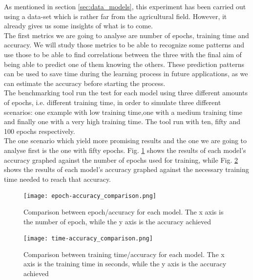 As mentioned in section \ref{sec:data_models}, this experiment has been carried out using a data-set which is rather far from the agricultural field. However, it already gives us some insights of what is to come. \\
The first metrics we are going to analyse are number of epochs, training time and accuracy. We will study those metrics to be able to recognize some patterns and use those to be able to find correlations between the three with the final aim of being able to predict one of them knowing the others. These prediction patterns can be used to save time during the learning process in future applications, as we can estimate the accuracy before starting the process.  \\
The benchmarking tool run the test for each model using three different amounts of epochs, i.e. different training time, in order to simulate three different scenarios: one example with low training time,one with a medium training time and finally one with a very high training time. The tool run with ten, fifty and 100 epochs respectively. \\
The one scenario which yield more promising results and the one we are going to analyse first is the one with fifty epochs. Fig. \ref{fig:com_ep_ac_models} shows the results of each model's accuracy graphed against the number of epochs used for training, while  Fig. \ref{fig:com_ti_ac_models} shows the results of each model's accuracy graphed against the necessary training time needed to reach that accuracy.\\




\begin{figure}[h]
       \centering 
	    \texttt{[image: epoch-accuracy\_comparison.png]}
        \caption[Comparison between epoch/accuracy for each model]{Comparison between epoch/accuracy for each model. The x axis is the number of epoch, while the y axis is the accuracy achieved}
         \label{fig:com_ep_ac_models}
     \end{figure}
\begin{figure}[h]
\centering 
	    \texttt{[image: time-accuracy\_comparison.png]}
        \caption[Comparison between training time/accuracy for each model]{Comparison between training time/accuracy for each model. The x axis is the training time in seconds, while the y axis is the accuracy achieved}
        \label{fig:com_ti_ac_models}
\end{figure}



